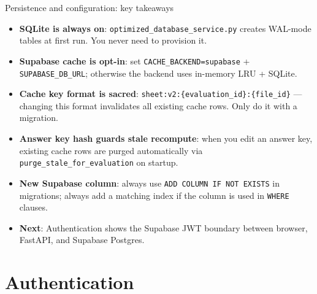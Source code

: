 \documentclass[aspectratio=169]{beamer}
\begin{document}
\begin{frame}{Persistence and configuration: key takeaways}
  \small
  \begin{itemize}\setlength\itemsep{0.3em}
    \item \textbf{SQLite is always on}: \texttt{optimized\_database\_service.py} creates WAL-mode tables at first run. You never need to provision it.
    \item \textbf{Supabase cache is opt-in}: set \texttt{CACHE\_BACKEND=supabase} + \texttt{SUPABASE\_DB\_URL}; otherwise the backend uses in-memory LRU + SQLite.
    \item \textbf{Cache key format is sacred}: \texttt{sheet:v2:\{evaluation\_id\}:\{file\_id\}} --- changing this format invalidates all existing cache rows. Only do it with a migration.
    \item \textbf{Answer key hash guards stale recompute}: when you edit an answer key, existing cache rows are purged automatically via \texttt{purge\_stale\_for\_evaluation} on startup.
    \item \textbf{New Supabase column}: always use \texttt{ADD COLUMN IF NOT EXISTS} in migrations; always add a matching index if the column is used in \texttt{WHERE} clauses.
    \item \textbf{Next}: Authentication shows the Supabase JWT boundary between browser, FastAPI, and Supabase Postgres.
  \end{itemize}
\end{frame}

\section{Authentication}
\end{document}
